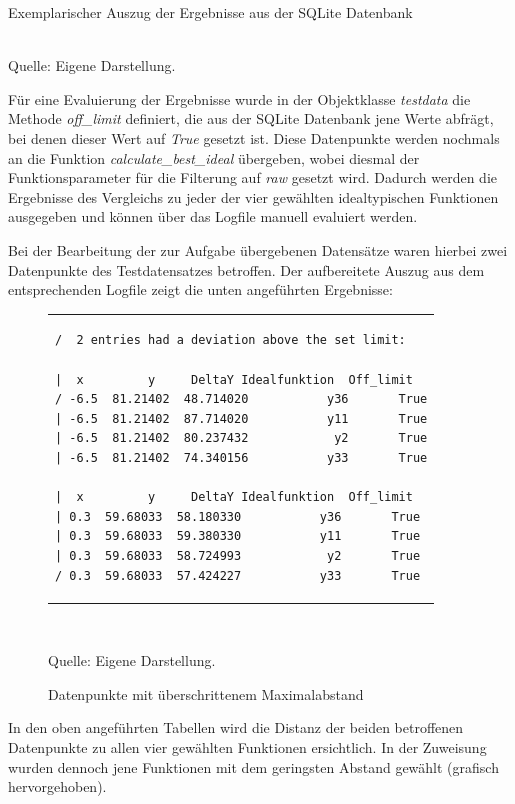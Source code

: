 \begin{table}[H]
\small
\centering
\caption{Exemplarischer Auszug der Ergebnisse aus der SQLite Datenbank}
\\
Quelle: Eigene Darstellung.
\label{tab:sqlitetest.csv}
\end{table} 

Für eine Evaluierung der Ergebnisse wurde in der Objektklasse \emph{testdata} die Methode \emph{off\_limit} definiert, die aus der SQLite Datenbank jene Werte abfrägt, bei denen dieser Wert auf \emph{True} gesetzt ist. Diese Datenpunkte werden nochmals an die Funktion \emph{calculate\_best\_ideal} übergeben, wobei diesmal der Funktionsparameter für die Filterung auf \emph{raw} gesetzt wird. Dadurch werden die Ergebnisse des Vergleichs zu jeder der vier gewählten idealtypischen Funktionen ausgegeben und können über das Logfile manuell evaluiert werden.

Bei der Bearbeitung der zur Aufgabe übergebenen Datensätze waren hierbei zwei Datenpunkte des Testdatensatzes betroffen. Der aufbereitete Auszug aus dem entsprechenden Logfile zeigt die unten angeführten Ergebnisse:

\begin{figure}[h]
\caption{Datenpunkte mit überschrittenem Maximalabstand}
\begin{tabular}{l}
\begin{lstlisting}[label=offlimit]
/  2 entries had a deviation above the set limit:

|  x         y     DeltaY Idealfunktion  Off_limit
/ -6.5  81.21402  48.714020           y36       True
| -6.5  81.21402  87.714020           y11       True
| -6.5  81.21402  80.237432            y2       True
| -6.5  81.21402  74.340156           y33       True

|  x         y     DeltaY Idealfunktion  Off_limit
| 0.3  59.68033  58.180330           y36       True
| 0.3  59.68033  59.380330           y11       True
| 0.3  59.68033  58.724993            y2       True
/ 0.3  59.68033  57.424227           y33       True
\end{lstlisting}
\end{tabular}\\
\begin{center}
Quelle: Eigene Darstellung.
\end{center}
\label{fig:offlimit}
\end{figure}

In den oben angeführten Tabellen wird die Distanz der beiden betroffenen Datenpunkte zu allen vier gewählten Funktionen ersichtlich. In der Zuweisung wurden dennoch jene Funktionen mit dem geringsten Abstand gewählt (grafisch hervorgehoben).

